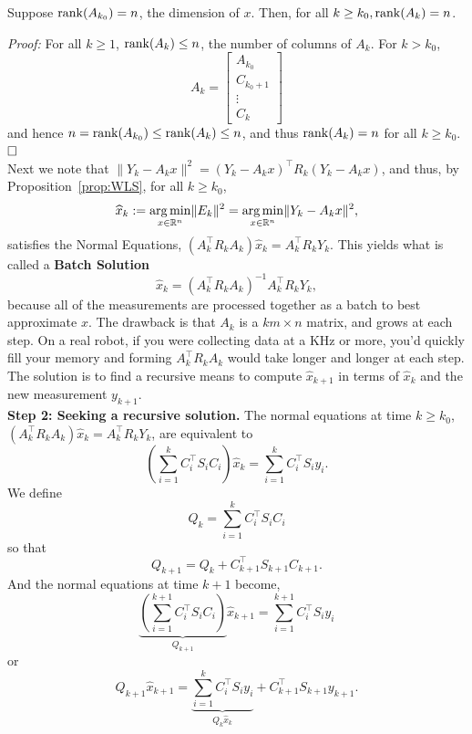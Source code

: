 \begin{claim} 
Suppose $\mathrm{rank}(A_{k_0})=n$, the dimension of $x$. Then, for all $k \ge k_0, \mathrm{rank}(A_{k})=n$.
\end{claim}

\textit{Proof:} For all $k\ge 1$, $ \mathrm{rank}(A_{k}) \le n$, the number of columns of $A_k$. For $k > k_0$, 
$$A_k =\left[ \begin{array}{c} A_{k_0} \\ C_{k_0+1} \\ \vdots \\C_{k} \end{array} \right] $$
and hence $n =  \mathrm{rank}(A_{k_0}) \le \mathrm{rank}(A_k) \le n$, and thus $ \mathrm{rank}(A_{k})=n$ for all $k \ge k_0$. 
$\hfill \square$ \\

Next we note that $ \|Y_k-A_kx\|^2= (Y_k-A_kx)^\top R_k(Y_k-A_kx)$, and thus, by Proposition~\ref{prop:WLS}, for all $k \ge k_0$,
    \begin{equation*}
        \widehat{x}_k:=\underset{x \in \mathbb R^n}{\operatorname*{arg\,min}}\| E_k \|^2=\underset{x \in \mathbb R^n}{\operatorname*{arg\,min}}\| Y_k-A_kx \|^2,
    \end{equation*}
satisfies the Normal Equations, $ (A_k^\top R_kA_k)\widehat{x}_k=A_k^\top R_kY_k $. This yields what is called a \textbf{Batch Solution}
$$\boxed{ \widehat{x}_k=(A_k^\top R_kA_k)^{-1}A_k^\top R_kY_k},$$
because all of the measurements are processed together as a batch to best approximate $x$. The drawback is that $A_k$ is a $km \times n$ matrix, and grows at each step. On a real robot, if you were collecting data at a KHz or more, you'd quickly fill your memory and forming $A_k^\top R_kA_k$ would take longer and longer at each step. The solution is to find a recursive means to compute $\widehat{x}_{k+1}$ in terms of $\widehat{x}_k$ and the new measurement $y_{k+1}$.\\


\textbf{Step 2: Seeking a recursive solution.} The normal equations at time $k\ge k_0$, $ (A_k^\top R_kA_k)\widehat{x}_k=A_k^\top R_kY_k $, are equivalent to
    $$\left(\sum\limits_{i=1}^k C_i^\top S_iC_i\right)\widehat{x}_k=\sum\limits_{i=1}^k C_i^\top S_iy_i.$$
We define
    \begin{equation*}
        Q_k=\sum\limits_{i=1}^k C_i^\top S_iC_i
    \end{equation*}
    so that
    \begin{equation*}
        Q_{k+1} = Q_k+C_{k+1}^\top S_{k+1}C_{k+1}.
    \end{equation*}
And the normal equations at time $k+1$ become,
    \begin{equation*}
        \underbrace{(\sum\limits_{i=1}^{k+1} C_i^\top S_iC_i)}_{Q_{k+1}}\widehat{x}_{k+1}=\sum\limits_{i=1}^{k+1} C_i^\top S_iy_i
    \end{equation*}
    \newline
    or
    \begin{equation*}
        Q_{k+1}\widehat{x}_{k+1}=\underbrace{\sum\limits_{i=1}^k C_i^\top S_iy_i}_{Q_k\widehat{x}_k}+C_{k+1}^\top S_{k+1}y_{k+1}.
    \end{equation*}
    
